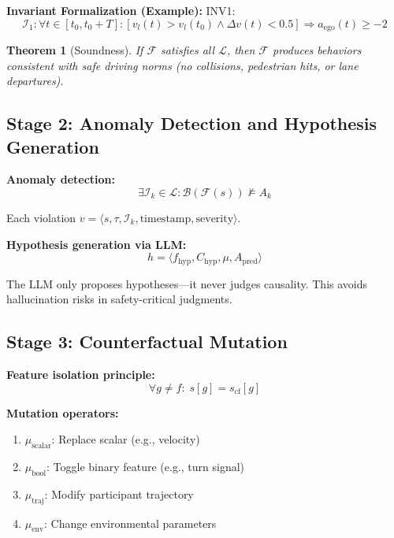 \documentclass[conference]{IEEEtran}
\theoremstyle{plain}
\newtheorem{theorem}{Theorem}[section]
\newcommand{\invlib}{\mathcal{L}}
\newcommand{\sys}{\mathcal{F}}
\newcommand{\beh}{\mathcal{B}}
\begin{document}
\textbf{Invariant Formalization (Example):} INV1:
\begin{equation}
\mathcal{I}_1: \forall t\in[t_0,t_0+T]: [v_l(t) > v_l(t_0) \land \Delta v(t) < 0.5] \Rightarrow a_{\text{ego}}(t) \geq -2
\label{eq:inv1}
\end{equation}

\begin{theorem}[Soundness]\label{thm:sound}
If $\sys$ satisfies all $\invlib$, then $\sys$ produces behaviors consistent with safe driving norms (no collisions, pedestrian hits, or lane departures).
\end{theorem}

\subsection{Stage 2: Anomaly Detection and Hypothesis Generation}
\textbf{Anomaly detection:}
\begin{equation}
\exists\mathcal{I}_k\in\invlib: \beh(\sys(s)) \not\models A_k \label{eq:anomaly}
\end{equation}

Each violation $v = \langle s,\tau,\mathcal{I}_k,\text{timestamp},\text{severity}\rangle$.

\textbf{Hypothesis generation via LLM:}
\begin{equation}
h = \langle f_{\text{hyp}}, C_{\text{hyp}}, \mu, A_{\text{pred}} \rangle \label{eq:hyp}
\end{equation}

The LLM only proposes hypotheses---it never judges causality. This avoids hallucination risks in safety-critical judgments.

\subsection{Stage 3: Counterfactual Mutation}
\textbf{Feature isolation principle:}
\begin{equation}
\forall g \neq f: \; s[g] = s_{\text{cf}}[g] \label{eq:isolation}
\end{equation}

\textbf{Mutation operators:}
\begin{enumerate}[nosep]
    \item $\mu_{\text{scalar}}$: Replace scalar (e.g., velocity)
    \item $\mu_{\text{bool}}$: Toggle binary feature (e.g., turn signal)
    \item $\mu_{\text{traj}}$: Modify participant trajectory
    \item $\mu_{\text{env}}$: Change environmental parameters
\end{enumerate}
\end{document}
